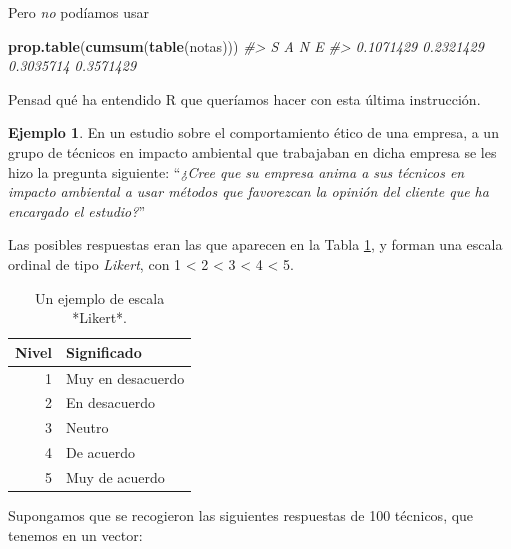 \documentclass[
]{book}
\newenvironment{Shaded}{\begin{snugshade}}{\end{snugshade}}
\newcommand{\CommentTok}[1]{\textcolor[rgb]{0.56,0.35,0.01}{\textit{#1}}}
\newcommand{\KeywordTok}[1]{\textcolor[rgb]{0.13,0.29,0.53}{\textbf{#1}}}
\newcommand{\NormalTok}[1]{#1}
\theoremstyle{definition}
\theoremstyle{definition}
\newtheorem{example}{Ejemplo}[chapter]
\theoremstyle{definition}
\theoremstyle{remark}
\begin{document}
Pero \emph{no} podíamos usar

\begin{Shaded}
\begin{Highlighting}[]
\KeywordTok{prop.table}\NormalTok{(}\KeywordTok{cumsum}\NormalTok{(}\KeywordTok{table}\NormalTok{(notas)))}
\CommentTok{\#\textgreater{}         S         A         N         E }
\CommentTok{\#\textgreater{} 0.1071429 0.2321429 0.3035714 0.3571429}
\end{Highlighting}
\end{Shaded}

Pensad qué ha entendido R que queríamos hacer con esta última instrucción.

\begin{example}
\protect\hypertarget{exm:ex1704}{}{\label{exm:ex1704} }En un estudio sobre el comportamiento ético de una empresa, a un grupo de técnicos en impacto ambiental que trabajaban en dicha empresa se les hizo la pregunta siguiente: ``\emph{¿Cree que su empresa anima a sus técnicos en impacto ambiental a usar métodos que favorezcan la opinión del cliente que ha encargado el estudio?}''
\end{example}

Las posibles respuestas eran las que aparecen en la Tabla \ref{tab:Likert}, y forman una escala ordinal de tipo \emph{Likert}, con 1 \textless{} 2 \textless{} 3 \textless{} 4 \textless{} 5.

\begin{table}

\caption{\label{tab:Likert}Un ejemplo de escala *Likert*.}
\centering
\begin{tabular}[t]{rl}
\toprule
Nivel & Significado\\
\midrule
1 & Muy en desacuerdo\\
2 & En desacuerdo\\
3 & Neutro\\
4 & De acuerdo\\
5 & Muy de acuerdo\\
\bottomrule
\end{tabular}
\end{table}

Supongamos que se recogieron las siguientes respuestas de 100 técnicos, que tenemos en un vector:
\end{document}
